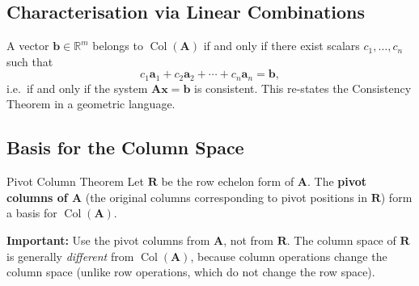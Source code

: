 \documentclass[12pt,a4paper]{article}
\newcommand{\R}{\mathbb{R}}
\newcommand{\vv}[1]{\mathbf{#1}}
\newcommand{\Col}{\operatorname{Col}}
\newcommand{\mat}[1]{\mathbf{#1}}
\begin{document}
	\subsection{Characterisation via Linear Combinations}
	
	A vector \(\vv{b} \in \R^m\) belongs to \(\Col(\mat{A})\) if and only if there exist
	scalars \(c_1, \ldots, c_n\) such that
	\[
	c_1\vv{a}_1 + c_2\vv{a}_2 + \cdots + c_n\vv{a}_n = \vv{b},
	\]
	i.e.\ if and only if the system \(\mat{A}\vv{x} = \vv{b}\) is consistent. This
	re-states the Consistency Theorem in a geometric language.
	
	\subsection{Basis for the Column Space}
	
	\begin{thmbox}{Pivot Column Theorem}{}
		Let \(\mat{R}\) be the row echelon form of \(\mat{A}\).  The \textbf{pivot columns
			of \(\mat{A}\)} (the original columns corresponding to pivot positions in \(\mat{R}\))
		form a basis for \(\Col(\mat{A})\).
	\end{thmbox}
	
	\begin{remarkbox}{}{}
		\textbf{Important:} Use the pivot columns from \(\mat{A}\), not from \(\mat{R}\).
		The column space of \(\mat{R}\) is generally \emph{different} from \(\Col(\mat{A})\),
		because column operations change the column space (unlike row operations, which do not
		change the row space).
	\end{remarkbox}
	
\end{document}
